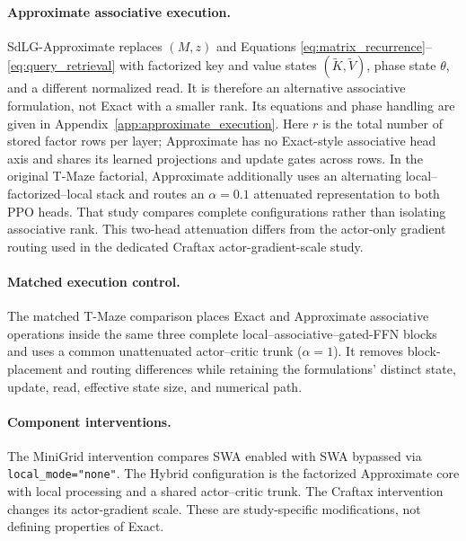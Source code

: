 \paragraph{Approximate associative execution.}
SdLG-Approximate replaces $(M,z)$ and Equations
\ref{eq:matrix_recurrence}--\ref{eq:query_retrieval} with factorized key and value
states $(\widetilde K,\widetilde V)$, phase state $\theta$, and a different
normalized read. It is therefore an alternative associative formulation, not
Exact with a smaller rank. Its equations and phase handling are given in
Appendix~\ref{app:approximate_execution}. Here $r$ is the total number of stored
factor rows per layer; Approximate has no Exact-style associative head axis and
shares its learned projections and update gates across rows. In the original T-Maze factorial,
Approximate additionally uses an alternating local--factorized--local stack and
routes an $\alpha=0.1$ attenuated representation to both PPO heads. That study
compares complete configurations rather than isolating associative rank. This
two-head attenuation differs from the actor-only gradient routing used in the
dedicated Craftax actor-gradient-scale study.

\paragraph{Matched execution control.}
The matched T-Maze comparison places Exact and Approximate associative operations
inside the same three complete local--associative--gated-FFN blocks and uses a
common unattenuated actor--critic trunk ($\alpha=1$). It removes block-placement
and routing differences while retaining the formulations' distinct state,
update, read, effective state size, and numerical path.

\paragraph{Component interventions.}
The MiniGrid intervention compares SWA enabled with SWA bypassed via
\texttt{local\_mode="none"}.
The Hybrid configuration is the factorized Approximate core with local
processing and a shared actor--critic trunk. The Craftax intervention changes
its actor-gradient scale. These are study-specific modifications, not defining
properties of Exact.
